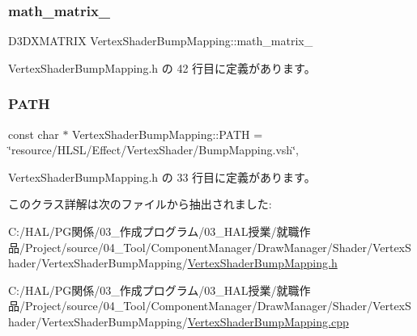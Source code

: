 \subsubsection{\texorpdfstring{math\+\_\+matrix\+\_\+}{math\_matrix\_}}
{\footnotesize\ttfamily D3\+D\+X\+M\+A\+T\+R\+IX Vertex\+Shader\+Bump\+Mapping\+::math\+\_\+matrix\+\_\+\hspace{0.3cm}{\ttfamily [private]}}



 Vertex\+Shader\+Bump\+Mapping.\+h の 42 行目に定義があります。

\mbox{\label{class_vertex_shader_bump_mapping_aa4b686f9aeb9e327ca79adf5974bc86d}} 
\subsubsection{\texorpdfstring{P\+A\+TH}{PATH}}
{\footnotesize\ttfamily const char $\ast$ Vertex\+Shader\+Bump\+Mapping\+::\+P\+A\+TH = \char`\"{}resource/H\+L\+SL/Effect/Vertex\+Shader/Bump\+Mapping.\+vsh\char`\"{}\hspace{0.3cm}{\ttfamily [static]}, {\ttfamily [private]}}



 Vertex\+Shader\+Bump\+Mapping.\+h の 33 行目に定義があります。



このクラス詳解は次のファイルから抽出されました\+:\begin{DoxyCompactItemize}
\item 
C\+:/\+H\+A\+L/\+P\+G関係/03\+\_\+作成プログラム/03\+\_\+\+H\+A\+L授業/就職作品/\+Project/source/04\+\_\+\+Tool/\+Component\+Manager/\+Draw\+Manager/\+Shader/\+Vertex\+Shader/\+Vertex\+Shader\+Bump\+Mapping/\mbox{\hyperlink{_vertex_shader_bump_mapping_8h}{Vertex\+Shader\+Bump\+Mapping.\+h}}\item 
C\+:/\+H\+A\+L/\+P\+G関係/03\+\_\+作成プログラム/03\+\_\+\+H\+A\+L授業/就職作品/\+Project/source/04\+\_\+\+Tool/\+Component\+Manager/\+Draw\+Manager/\+Shader/\+Vertex\+Shader/\+Vertex\+Shader\+Bump\+Mapping/\mbox{\hyperlink{_vertex_shader_bump_mapping_8cpp}{Vertex\+Shader\+Bump\+Mapping.\+cpp}}\end{DoxyCompactItemize}
